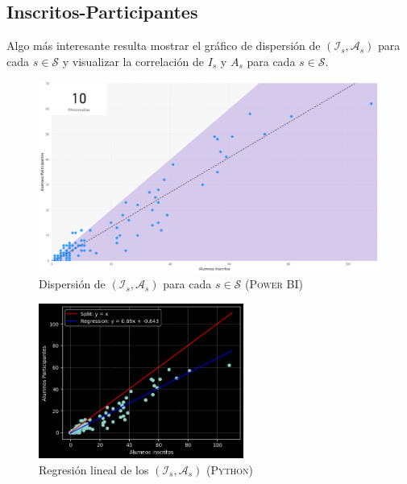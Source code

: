 \documentclass[11pt,a4paper]{book}
\theoremstyle{definition}%
\begin{document}
                \subsection{Inscritos-Participantes}
                    Algo más interesante resulta mostrar el gráfico de dispersión de $(\mathcal{I}_s,\mathcal{A}_s)$ para cada $s\in\mathcal{S}$ y visualizar la correlación de $I_s$ y $A_s$ para cada $s\in\mathcal{S}$.
                    \begin{figure}[H]
                        \centering
                        \includegraphics[width=1\textwidth]{Sources/dispersion_InscritosParticipantes.png}
                        \caption{Dispersión de $(\mathcal{I}_s,\mathcal{A}_s)$ para cada $s\in\mathcal{S}$ (\textsc{Power BI})}
                        \label{fig:dispersion_InscritosParticipantes}
                    \end{figure}
                    \begin{figure}[H]
                        \centering
                        \includegraphics[width=0.6\textwidth]{Sources/linearregression_InscritosParticipantes.png}
                        \caption{Regresión lineal de los $(\mathcal{I}_s,\mathcal{A}_s)$ (\textsc{Python})}
                        \label{fig:linearregression_InscritosParticipantes}
                    \end{figure}
\end{document}
